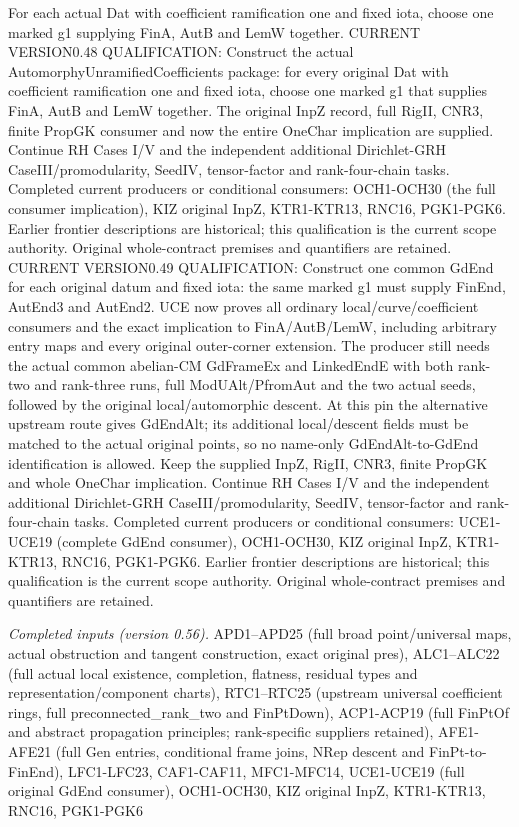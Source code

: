 \documentclass[11pt,a4paper]{article}
\numberwithin{equation}{section}
\theoremstyle{remark}\newtheorem{remark}[theorem]{Remark}
\begin{document}
For each actual Dat with coefficient ramification one and fixed iota, choose one marked g1 supplying FinA, AutB and LemW together. CURRENT VERSION0.48 QUALIFICATION: Construct the actual AutomorphyUnramifiedCoefficients package: for every original Dat with coefficient ramification one and fixed iota, choose one marked g1 that supplies FinA, AutB and LemW together. The original InpZ record, full RigII, CNR3, finite PropGK consumer and now the entire OneChar implication are supplied. Continue RH Cases I/V and the independent additional Dirichlet-GRH CaseIII/promodularity, SeedIV, tensor-factor and rank-four-chain tasks. Completed current producers or conditional consumers: OCH1-OCH30 (the full consumer implication), KIZ original InpZ, KTR1-KTR13, RNC16, PGK1-PGK6. Earlier frontier descriptions are historical; this qualification is the current scope authority. Original whole-contract premises and quantifiers are retained. CURRENT VERSION0.49 QUALIFICATION: Construct one common GdEnd for each original datum and fixed iota: the same marked g1 must supply FinEnd, AutEnd3 and AutEnd2. UCE now proves all ordinary local/curve/coefficient consumers and the exact implication to FinA/AutB/LemW, including arbitrary entry maps and every original outer-corner extension. The producer still needs the actual common abelian-CM GdFrameEx and LinkedEndE with both rank-two and rank-three runs, full ModUAlt/PfromAut and the two actual seeds, followed by the original local/automorphic descent. At this pin the alternative upstream route gives GdEndAlt; its additional local/descent fields must be matched to the actual original points, so no name-only GdEndAlt-to-GdEnd identification is allowed. Keep the supplied InpZ, RigII, CNR3, finite PropGK and whole OneChar implication. Continue RH Cases I/V and the independent additional Dirichlet-GRH CaseIII/promodularity, SeedIV, tensor-factor and rank-four-chain tasks. Completed current producers or conditional consumers: UCE1-UCE19 (complete GdEnd consumer), OCH1-OCH30, KIZ original InpZ, KTR1-KTR13, RNC16, PGK1-PGK6. Earlier frontier descriptions are historical; this qualification is the current scope authority. Original whole-contract premises and quantifiers are retained.

\emph{Completed inputs (version 0.56).} APD1–APD25 (full broad point/universal maps, actual obstruction and tangent construction, exact original pres), ALC1–ALC22 (full actual local existence, completion, flatness, residual types and representation/component charts), RTC1–RTC25 (upstream universal coefficient rings, full preconnected\_\allowbreak rank\_\allowbreak two and FinPtDown), ACP1-ACP19 (full FinPtOf and abstract propagation principles; rank-specific suppliers retained), AFE1-AFE21 (full Gen entries, conditional frame joins, NRep descent and FinPt-to-FinEnd), LFC1-LFC23, CAF1-CAF11, MFC1-MFC14, UCE1-UCE19 (full original GdEnd consumer), OCH1-OCH30, KIZ original InpZ, KTR1-KTR13, RNC16, PGK1-PGK6
\end{document}
